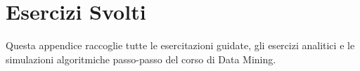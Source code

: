 \chapter{Esercizi Svolti}
\label{app:dm-exercises}

Questa appendice raccoglie tutte le esercitazioni guidate, gli esercizi analitici e le simulazioni algoritmiche passo-passo del corso di Data Mining.









